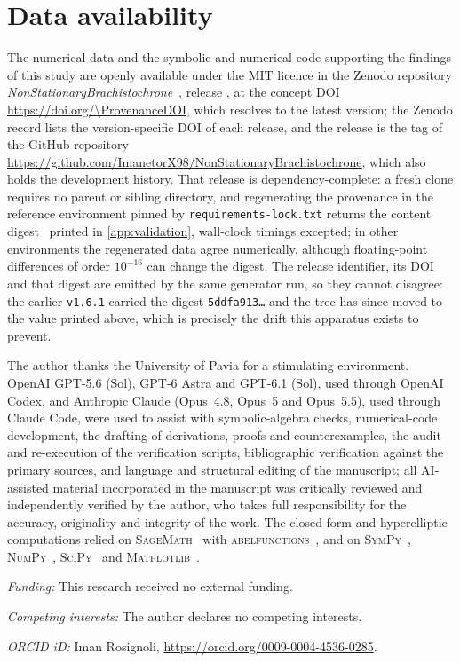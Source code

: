 \documentclass[12pt]{iopart}
\theoremstyle{plain}
\theoremstyle{definition}
\theoremstyle{remark}
\begin{document}
\clearpage


\section*{Data availability}
The numerical data and the symbolic and numerical code supporting the findings of this
study are openly available under the MIT licence in the Zenodo repository
\emph{NonStationaryBrachistochrone}~\cite{Rosignoli2026Code}, release
\texttt{\ProvenanceRelease}, at the concept DOI \url{https://doi.org/\ProvenanceDOI},
which resolves to the latest version; the Zenodo record lists the version-specific DOI
of each release, and the release is the tag \texttt{\ProvenanceRelease} of the GitHub
repository \url{https://github.com/ImanetorX98/NonStationaryBrachistochrone}, which
also holds the development history.
That release is dependency-complete: a fresh clone requires no parent or sibling
directory, and regenerating the provenance in the reference environment pinned by
\texttt{requirements-lock.txt} returns the content digest \ProvenanceDigest\ printed in
\ref{app:validation}, wall-clock timings excepted; in other environments the regenerated
data agree numerically, although floating-point differences of order $10^{-16}$ can change
the digest. The release identifier, its DOI and that digest are emitted by the same
generator run, so they cannot disagree: the earlier \texttt{v1.6.1} carried the
digest \texttt{5ddfa913\dots} and the tree has since moved to the value printed
above, which is precisely the drift this apparatus exists to prevent.

\ack
The author thanks the University of Pavia for a stimulating environment. OpenAI
GPT-5.6 (Sol), GPT-6 Astra and GPT-6.1 (Sol), used through OpenAI Codex, and Anthropic
Claude (Opus~4.8, Opus~5 and Opus~5.5), used through Claude Code, were used to assist with symbolic-algebra checks, numerical-code development,
the drafting of derivations, proofs and counterexamples, the audit and re-execution of the
verification scripts, bibliographic verification against the primary sources, and language
and structural editing of the manuscript; all AI-assisted material incorporated in the
manuscript was critically reviewed and independently verified by the author,
who takes full responsibility for the accuracy, originality and integrity of the work. The
closed-form and hyperelliptic computations relied on \textsc{SageMath}~\cite{SageMath}
with \textsc{abelfunctions}~\cite{abelfunctions}, and on
\textsc{SymPy}~\cite{SymPy}, \textsc{NumPy}~\cite{NumPy}, \textsc{SciPy}~\cite{SciPy} and
\textsc{Matplotlib}~\cite{Matplotlib}.

\medskip\noindent\textit{Funding:} This research received no external funding.

\medskip\noindent\textit{Competing interests:} The author declares no competing interests.

\medskip\noindent\textit{ORCID iD:} Iman Rosignoli,
\url{https://orcid.org/0009-0004-4536-0285}.



\end{document}
